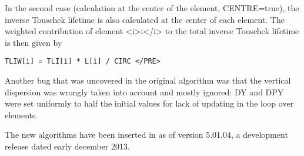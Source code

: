 In the second case (calculation at the center of the element,
CENTRE=true), the inverse Touschek lifetime is also calculated at the
center of each element. The weighted contribution of element <i>i</i> to
the total inverse Touschek lifetime is then given by 
\begin{verbatim}
TLIW[i] = TLI[i] * L[i] / CIRC </PRE>
\end{verbatim}

Another bug that was uncovered in the original algorithm was that the
vertical dispersion was wrongly taken into account and mostly ignored:
DY and DPY were set uniformly to half the initial values for lack of
updating in the loop over elements.  

The new algorithms have been inserted in \madx as of version 5.01.04, a
development release dated early december 2013.  

